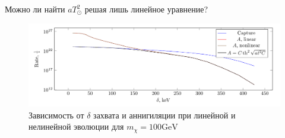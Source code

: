Можно ли найти $aT_{\odot}^2$ решая лишь линейное уравнение?

\begin{figure}[!h]
	\centering
	\includegraphics[width=\textwidth]{images/LinearNonLinear.png}
	\caption{Зависимость от $\delta$ захвата и аннигиляции при линейной и нелинейной эволюции для $m_{\chi} = 100\text{GeV}$}
\end{figure}
